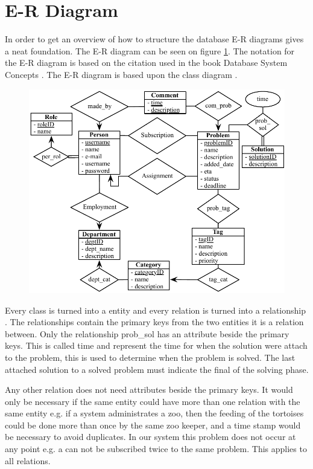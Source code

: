 \newcommand{\erdiagram}[1][]{E-R diagram}
\section{E-R Diagram}
In order to get an overview of how to structure the database \erdiagram[]s gives a neat foundation. The \erdiagram[] can be seen on figure \ref{fig:er_diagram}. The notation for the \erdiagram[] is based on the citation used in the book Database System Concepts \cite[p. 305]{Sudershan2011}. 
The \erdiagram[] is based upon the class diagram . 

\begin{figure}[h]
	\centering
		\includegraphics[scale=0.8]{input/implementation/database/ER-diagram.pdf}
	\label{fig:er_diagram}
\end{figure}

Every class is turned into a entity and every relation is turned into a relationship \cite[p. 259 - 321]{Sudershan2011}. The relationships contain the primary keys from the two entities it is a relation between. Only the relationship prob\_sol has an attribute beside the primary keys. This is called time and represent the time for when the solution were attach to the problem, this is used to determine when the problem is solved. The last attached solution to a solved problem must indicate the final of the solving phase. 

Any other relation does not need attributes beside the primary keys. It would only be necessary if the same entity could have more than one relation with the same entity e.g. if a system administrates a zoo, then the feeding of the tortoises could be done more than once by the same zoo keeper, and a time stamp would be necessary to avoid duplicates. In our system this problem does not occur at any point e.g. a \client[] can not be subscribed twice to the same problem. This applies to all relations. 

